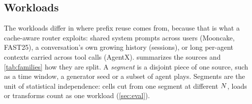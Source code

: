 \subsection{Workloads}
\label{sec:workloads}

The workloads differ in where prefix reuse comes from, because that is what a cache-aware router
exploits: shared system prompts across users (Mooncake, FAST25), a conversation's own growing
history (sessions), or long per-agent contexts carried across tool calls (AgentX).
 summarizes the sources and \cref{tab:families} how they are split. A
\emph{segment} is a disjoint piece of one source, such as a time window, a generator seed or a
subset of agent plays. Segments are the unit of statistical independence: cells cut from one
segment at different $N$, loads or transforms count as one workload (\cref{sec:eval}).

